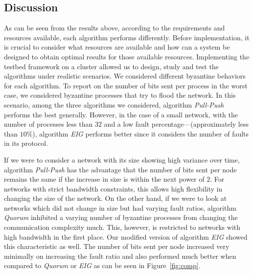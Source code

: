 ﻿\subsection{Discussion}


As can be seen from the results above, according to the requirements and
resources available, each algorithm performs differently. Before
implementation, it is crucial to consider what resources are available and how
can a system be designed to obtain optimal results for those available
resources. Implementing the testbed framework on a cluster allowed us to
design, study and test the algorithms under realistic scenarios. We considered
different byzantine behaviors for each algorithm. To report on the number of
bits sent per process in the worst case, we considered byzantine processes that
try to flood the network. In this scenario, among the three algorithms we
considered, algorithm \textit{Pull-Push} performs the best generally. However,
in the case of a small network, with the number of processes less than $32$ and
a low fault percentage---(approximately less than $10\%$), algorithm
\textit{EIG} performs better since it considers the number of faults in its
protocol. 

If we were to consider a network with its size showing high variance over time,
algorithm \textit{Pull-Push} has the advantage that the number of bits sent per
node remains the same if the increase in size is within the next power of $2$.
For networks with strict bandwidth constraints, this allows high flexibility in
changing the size of the network. On the other hand, if we were to look at
networks which did not change in size but had varying fault ratios, algorithm
\textit{Quorum} inhibited a varying number of byzantine processes from changing
the communication complexity much. This, however, is restricted to networks
with high bandwidth in the first place. Our modified version of algorithm
\textit{EIG} showed this characteristic as well. The number of bits sent per
node increased very minimally on increasing the fault ratio and also performed
much better when compared to \textit{Quorum} or \textit{EIG} as can be seen in
Figure~\ref{fig:comp}.

